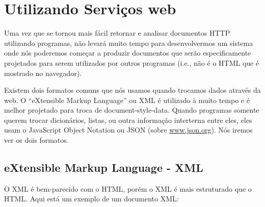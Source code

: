 
\chapter{Utilizando Serviços web}

Uma vez que se tornou mais fácil retornar e analisar documentos
HTTP utilizando programas, não levará muito tempo para desenvolvermos
um sistema onde nós poderemos começar a produzir documentos que serão
especificamente projetados para serem utilizados por outros
programas (i.e., não é o HTML que é mostrado no navegador).

Existem dois formatos comuns que nós usamos quando trocamos dados através da web.
O ``eXtensible Markup Language'' ou XML é utilizado à muito tempo
e é melhor projetado para troca de document-style-data. Quando programas somente
querem trocar dicionários, listas, ou outra informação interterna entre eles, 
eles usam o JavaScript Object Notation ou JSON (sobre \url{www.json.org}).
Nós iremos ver os dois formatos.

\section{eXtensible Markup Language - XML}

O XML é bem-parecido com o HTML, porém o XML é mais estruturado
que o HTML. Aqui está um exemplo de um documento XML:

